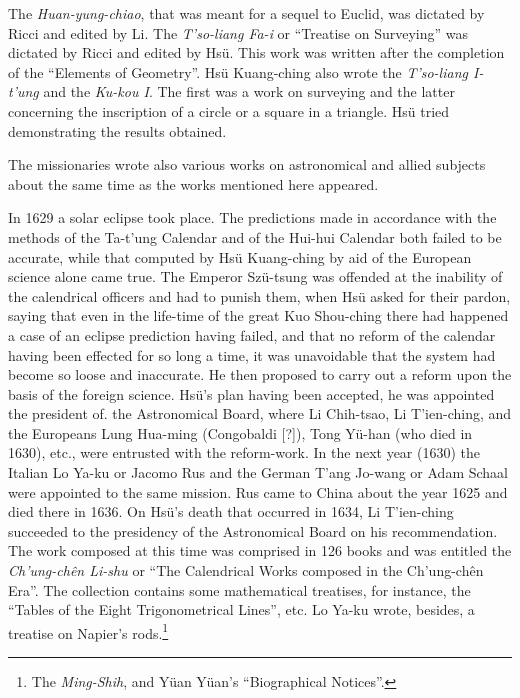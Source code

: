 \documentclass[11pt]{article}
\newcommand{\scanfooter}{}
\begin{document}
The \emph{Huan-yung-chiao}, that was meant for a sequel to Euclid, was dictated by Ricci and edited by Li. The \emph{T'so-liang Fa-i} or ``Treatise on Surveying'' was dictated by Ricci and edited by Hsü. This work was written after the completion of the ``Elements of Geometry''. Hsü Kuang-ching also wrote the \emph{T'so-liang I-t'ung} and the \emph{Ku-kou I}. The first was a work on surveying and the latter concerning the inscription of a circle or a square in a triangle. Hsü tried demonstrating the results obtained.

The missionaries wrote also various works on astronomical and allied subjects about the same time as the works mentioned here appeared.

In 1629 a solar eclipse took place. The predictions made in accordance with the methods of the Ta-t'ung Calendar and of the Hui-hui Calendar both failed to be accurate, while that computed by Hsü Kuang-ching by aid of the European science alone came true. The Emperor Szü-tsung was offended at the inability of the calendrical officers and had to punish them, when Hsü asked for their pardon, saying that even in the life-time of the great Kuo Shou-ching there had happened a case of an eclipse prediction having failed, and that no reform of the calendar having been effected for so long a time, it was unavoidable that the system had become so loose and inaccurate. He then proposed to carry out a reform upon the basis of the foreign science. Hsü's plan having been accepted, he was appointed the president of. the Astronomical Board, where Li Chih-tsao, Li T'ien-ching, and the Europeans Lung Hua-ming (Congobaldi [?]), Tong Yü-han (who died in 1630), etc., were entrusted with the reform-work. In the next year (1630) the Italian Lo Ya-ku or Jacomo Rus and the German T'ang Jo-wang or Adam Schaal were appointed to the same mission. Rus came to China about the year 1625 and died there in 1636. On Hsü's death that occurred in 1634, Li T'ien-ching succeeded to the presidency of the Astronomical Board on his recommendation. The work composed at this time was comprised in 126 books and was entitled the \emph{Ch'ung-chên Li-shu} or ``The Calendrical Works composed in the Ch'ung-chên Era''. The collection contains some mathematical treatises, for instance, the ``Tables of the Eight Trigonometrical Lines'', etc. Lo Ya-ku wrote, besides, a treatise on Napier's rods.\footnote{The \emph{Ming-Shih}, and Yüan Yüan's ``Biographical Notices''.}
\scanfooter
\end{document}
